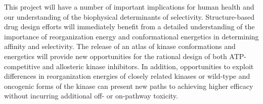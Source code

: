 \documentclass[11pt]{article}
\begin{document}
This project will have a number of important implications for human health and our understanding of the biophysical determinants of selectivity.
Structure-based drug design efforts will immediately benefit from a detailed understanding of the importance of reorganization energy and conformational energetics in determining affinity and selectivity.
The release of an atlas of kinase conformations and energetics will provide new opportunities for the rational design of both ATP-competitive and allosteric kinase inhibitors.
In addition, opportunities to exploit differences in reorganization energies of closely related kinases or wild-type and oncogenic forms of the kinase can present new paths to achieving higher efficacy without incurring additional off- or on-pathway toxicity.
\end{document}
